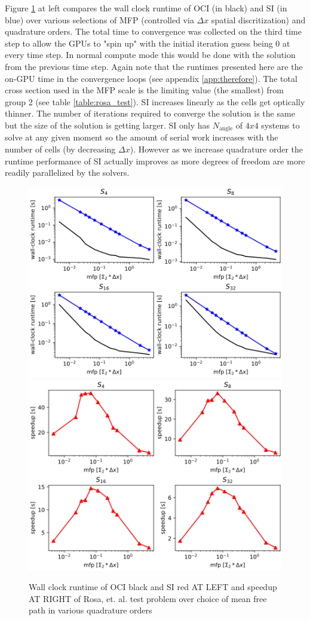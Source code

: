 Figure \ref{fig:perf} at left compares the wall clock runtime of OCI (in black) and SI (in blue) over various selections of MFP (controlled via $\Delta x$ spatial discritization) and quadrature orders.
The total time to convergence was collected on the third time step to allow the GPUs to "spin up" with the initial iteration guess being 0 at every time step.
In normal compute mode this would be done with the solution from the previous time step.
Again note that the runtimes presented here are the on-GPU time in the convergence loops (see appendix \ref{app:therefore}).
The total cross section used in the MFP scale is the limiting value (the smallest) from group 2 (see table \ref{table:rosa_test}).
SI increases linearly as the cells get optically thinner.
The number of iterations required to converge the solution is the same but the size of the solution is getting larger.
SI only has $N_{\text{angle}}$ of $4x4$ systems to solve at any given moment so the amount of serial work increases with the number of cells (by decreasing $\Delta x$).
However as we increase quadrature order the runtime performance of SI actually improves as more degrees of freedom are more readily parallelized by the solvers.

\begin{figure}[h!]
    \centering
    \includegraphics[width=.49\textwidth]{figures/results/runtime.png}
    \includegraphics[width=.49\textwidth]{figures/results/speedup.png}
    \caption{Wall clock runtime of OCI black and SI red AT LEFT and speedup AT RIGHT of Rosa, et. al. test problem over choice of mean free path in various quadrature orders}
    \label{fig:perf}
\end{figure}

